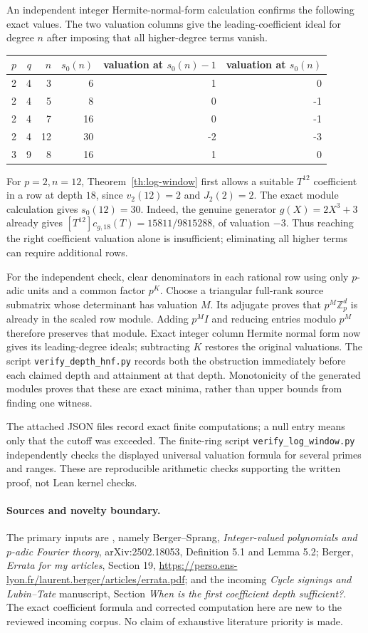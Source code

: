An independent integer Hermite-normal-form calculation confirms the following
exact values.  The two valuation columns give the leading-coefficient ideal
for degree $n$ after imposing that all higher-degree terms vanish.
\begin{center}
\begin{tabular}{rrrrrr}
$p$ & $q$ & $n$ & $s_0(n)$ & valuation at $s_0(n)-1$ & valuation at $s_0(n)$\\
\hline
2&4&3&6&1&0\\
2&4&5&8&0&-1\\
2&4&7&16&0&-1\\
2&4&12&30&-2&-3\\
3&9&8&16&1&0
\end{tabular}
\end{center}
For $p=2,n=12$, Theorem~\ref{th:log-window} first allows a suitable
$T^{12}$ coefficient in a row at depth $18$, since $v_2(12)=2$ and
$J_2(2)=2$.  The exact module calculation gives $s_0(12)=30$.
Indeed, the genuine generator $g(X)=2X^3+3$ already gives
$[T^{12}]c_{g,18}(T)=15811/9815288$, of valuation $-3$.
Thus reaching the right coefficient valuation alone is insufficient;
eliminating all higher terms can require additional rows.

For the independent check, clear denominators in each rational row using
only $p$-adic units and a common factor $p^K$.  Choose a triangular full-rank
source submatrix whose determinant has valuation $M$.  Its adjugate proves
that $p^M\mathbb Z_p^d$ is already in the scaled row module.  Adding $p^M I$
and reducing entries modulo $p^M$ therefore preserves that module.  Exact
integer column Hermite normal form now gives its leading-degree ideals;
subtracting $K$ restores the original valuations.  The script
\texttt{verify\_depth\_hnf.py} records both the obstruction immediately
before each claimed depth and attainment at that depth.  Monotonicity of
the generated modules proves that these are exact minima, rather than
upper bounds from finding one witness.

The attached JSON files record exact finite computations; a null entry
means only that the cutoff was exceeded.  The finite-ring script
\texttt{verify\_log\_window.py} independently checks the displayed universal
valuation formula for several primes and ranges.  These are reproducible
arithmetic checks supporting the written proof, not Lean kernel checks.

\paragraph{Sources and novelty boundary.}
The primary inputs are \cite{BS,BergerErrata}, namely Berger--Sprang, \emph{Integer-valued polynomials and
$p$-adic Fourier theory}, arXiv:2502.18053, Definition 5.1 and Lemma 5.2;
Berger, \emph{Errata for my articles}, Section 19,
\url{https://perso.ens-lyon.fr/laurent.berger/articles/errata.pdf}; and the
incoming \emph{Cycle signings and Lubin--Tate} manuscript, Section
\emph{When is the first coefficient depth sufficient?}.  The exact
coefficient formula and corrected computation here are new to the reviewed
incoming corpus.  No claim of exhaustive literature priority is made.
